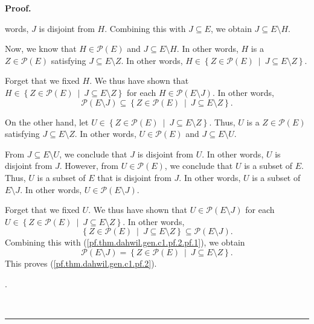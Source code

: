 \documentclass[numbers=enddot,12pt,final,onecolumn,notitlepage]{scrartcl}%
\theoremstyle{definition}
\newenvironment{proof}[1][Proof]{\noindent\textbf{#1.} }{\ \rule{0.5em}{0.5em}}
\newenvironment{verlong}{}{}
\begin{document}
\begin{proof}
\begin{verlong}
{words, $J$ is disjoint from $H$. Combining this with $J\subseteq E$, we obtain
$J\subseteq E\setminus H$.
\par
Now, we know that $H\in\mathcal{P}\left(  E\right)  $ and $J\subseteq
E\setminus H$. In other words, $H$ is a $Z\in\mathcal{P}\left(  E\right)  $
satisfying $J\subseteq E\setminus Z$. In other words, $H\in\left\{
Z\in\mathcal{P}\left(  E\right)  \ \mid\ J\subseteq E\setminus Z\right\}  $.
\par
Forget that we fixed $H$. We thus have shown that $H\in\left\{  Z\in
\mathcal{P}\left(  E\right)  \ \mid\ J\subseteq E\setminus Z\right\}  $ for
each $H\in\mathcal{P}\left(  E\setminus J\right)  $. In other words,%
\begin{equation}
\mathcal{P}\left(  E\setminus J\right)  \subseteq\left\{  Z\in\mathcal{P}%
\left(  E\right)  \ \mid\ J\subseteq E\setminus Z\right\}  .
\label{pf.thm.dahwil.gen.c1.pf.2.pf.1}%
\end{equation}
\par
On the other hand, let $U\in\left\{  Z\in\mathcal{P}\left(  E\right)
\ \mid\ J\subseteq E\setminus Z\right\}  $. Thus, $U$ is a $Z\in
\mathcal{P}\left(  E\right)  $ satisfying $J\subseteq E\setminus Z$. In other
words, $U\in\mathcal{P}\left(  E\right)  $ and $J\subseteq E\setminus U$.
\par
From $J\subseteq E\setminus U$, we conclude that $J$ is disjoint from $U$. In
other words, $U$ is disjoint from $J$. However, from $U\in\mathcal{P}\left(
E\right)  $, we conclude that $U$ is a subset of $E$. Thus, $U$ is a subset of
$E$ that is disjoint from $J$. In other words, $U$ is a subset of $E\setminus
J$. In other words, $U\in\mathcal{P}\left(  E\setminus J\right)  $.
\par
Forget that we fixed $U$. We thus have shown that $U\in\mathcal{P}\left(
E\setminus J\right)  $ for each $U\in\left\{  Z\in\mathcal{P}\left(  E\right)
\ \mid\ J\subseteq E\setminus Z\right\}  $. In other words,%
\[
\left\{  Z\in\mathcal{P}\left(  E\right)  \ \mid\ J\subseteq E\setminus
Z\right\}  \subseteq\mathcal{P}\left(  E\setminus J\right)  .
\]
Combining this with (\ref{pf.thm.dahwil.gen.c1.pf.2.pf.1}), we obtain
\[
\mathcal{P}\left(  E\setminus J\right)  =\left\{  Z\in\mathcal{P}\left(
E\right)  \ \mid\ J\subseteq E\setminus Z\right\}  .
\]
This proves (\ref{pf.thm.dahwil.gen.c1.pf.2}).}.


\end{verlong}
\end{proof}
\end{document}
